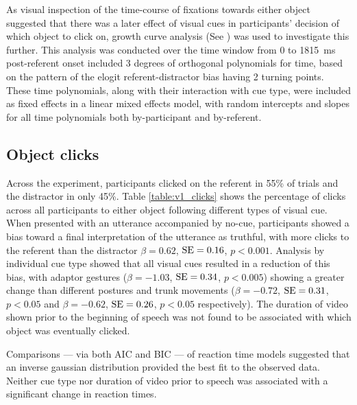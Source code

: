 \documentclass[a4paper,man,natbib]{apa6}
\newcommand{\resultsLog}[3]{$\beta = #1$, $\textnormal{SE} = #2$, $p #3$}
\begin{document}
As visual inspection of the time-course of fixations towards either object suggested that there was a later effect of visual cues in participants' decision of which object to click on, growth curve analysis (See \citealt{Mirman2008}) was used to investigate this further. 
This analysis was conducted over the time window from 0 to 1815~ms post-referent onset included 3 degrees of orthogonal polynomials for time, based on the pattern of the elogit referent-distractor bias having 2 turning points. 
These time polynomials, along with their interaction with cue type, were included as fixed effects in a linear mixed effects model, with random intercepts and slopes for all time polynomials both by-participant and by-referent.


\subsection{Object clicks} 
Across the experiment, participants clicked on the referent in 55\% of trials and the distractor in only 45\%.
Table \ref{table:v1_clicks} shows the percentage of clicks across all participants to either object following different types of visual cue.
When presented with an utterance accompanied by no-cue, participants showed a bias toward a final interpretation of the utterance as truthful, with more clicks to the referent than the distractor \resultsLog{0.62}{0.16}{<0.001}.
Analysis by individual cue type showed that all visual cues resulted in a reduction of this bias, with adaptor gestures (\resultsLog{-1.03}{0.34}{<0.005}) showing a greater change than different postures and trunk movements (\resultsLog{-0.72}{0.31}{<0.05} and \resultsLog{-0.62}{0.26}{<0.05} respectively). %
The duration of video shown prior to the beginning of speech was not found to be associated with which object was eventually clicked.

Comparisons --- via both AIC and BIC --- of reaction time models suggested that an inverse gaussian distribution provided the best fit to the observed data.
Neither cue type nor duration of video prior to speech was associated with a significant change in reaction times.
\end{document}

